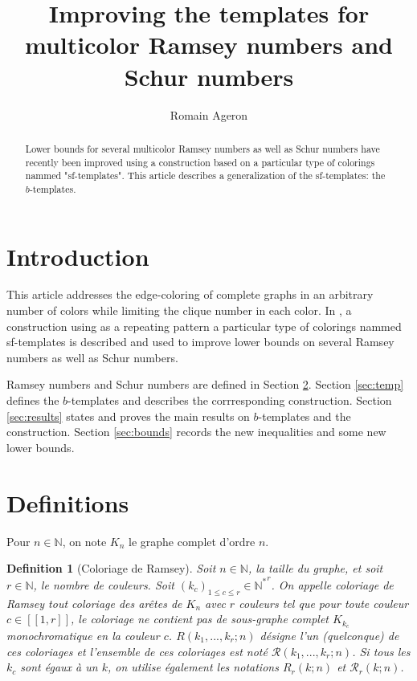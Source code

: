 \documentclass{article}
\title{Improving the templates for multicolor Ramsey numbers and Schur numbers}
\author{Romain Ageron}
\newtheorem{definition}{Definition}[section]
\begin{document}
\maketitle

\begin{abstract}
Lower bounds for several multicolor Ramsey numbers as well as Schur numbers have recently been improved using a 
construction based on a particular type of colorings nammed "sf-templates". This article describes a generalization of 
the sf-templates: the \(b\)-templates.
\end{abstract}

\section{Introduction}
This article addresses the edge-coloring of complete graphs in an arbitrary number of colors while limiting the clique 
number in each color. In \cite{RowleyRamsey}, a construction using as a repeating pattern a particular type of 
colorings nammed sf-templates is described and used to improve lower bounds on several Ramsey numbers as well as Schur 
numbers. 

Ramsey numbers and Schur numbers are defined in Section \ref{sec:def}. Section \ref{sec:temp} defines the 
\(b\)-templates and describes the corrresponding construction. Section \ref{sec:results} states and proves the main 
results on \(b\)-templates and the construction. Section \ref{sec:bounds} records the new inequalities and some new 
lower bounds.

\section{Definitions}
\label{sec:def}

Pour \(n \in \mathbb{N}\), on note \(K_n\) le graphe complet d'ordre \(n\).

\begin{definition}[Coloriage de Ramsey]
Soit \(n \in \mathbb{N}\), la taille du graphe, et soit \(r \in \mathbb{N}\), le nombre de couleurs. Soit \((k_c)_{1 \leqslant c \leqslant r} \in {\mathbb{N}^*}^r\). On appelle coloriage de Ramsey tout coloriage des arêtes de \(K_n\) avec \(r\) couleurs tel que pour toute couleur \(c \in [\![1, r]\!]\), le coloriage ne contient pas de sous-graphe complet \(K_{k_c}\) monochromatique en la couleur \(c\). \(R(k_1, ..., k_r ; n)\) désigne l'un (quelconque) de ces coloriages et l'ensemble de ces coloriages est noté \(\mathcal{R}(k_1, ..., k_r ; n)\). Si tous les \(k_c\) sont égaux à un \(k\), on utilise également les notations \(R_r(k; n)\) et \(\mathcal{R}_r(k; n)\).
\end{definition}
\end{document}
